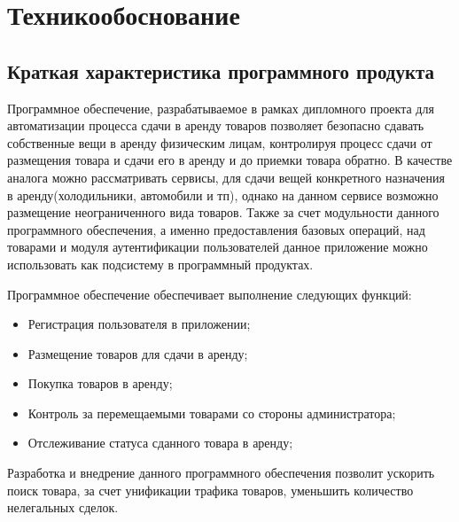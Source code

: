 \FPeval{\netProfitExact}{(\profitIncWithOneIndex + \profitIncFullYearWithTwoIndex + \profitIncFullYearWithThreeIndex) / \paybackInYears}



\section{Технико обоснование}
\label{sec:economics}

\subsection{Краткая характеристика программного продукта}
\label{sub:economics:description}

Программное обеспечение, разрабатываемое в рамках дипломного проекта для автоматизации процесса сдачи в аренду товаров позволяет безопасно сдавать собственные вещи в аренду физическим лицам, контролируя процесс сдачи от размещения товара и сдачи его в аренду и до приемки товара обратно.
В качестве аналога можно рассматривать сервисы, для сдачи вещей конкретного назначения в аренду(холодильники, автомобили и тп), однако на данном сервисе возможно размещение неограниченного вида товаров.
Также за счет модульности данного программного обеспечения, а именно предоставления базовых операций, над товарами и модуля аутентификации пользователей данное приложение можно использовать как подсистему в программный продуктах.

Программное обеспечение обеспечивает выполнение следующих функций:
\begin{itemize}
  \item Регистрация пользователя в приложении;
  \item Размещение товаров для сдачи в аренду;
  \item Покупка товаров в аренду;
  \item Контроль за перемещаемыми товарами со стороны администратора;
  \item Отслеживание статуса сданного товара в аренду;
\end{itemize}

Разработка и внедрение данного программного обеспечения позволит ускорить поиск товара, за счет унификации трафика товаров, уменьшить количество нелегальных сделок.

